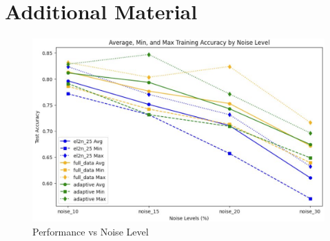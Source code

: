\documentclass{article}
\begin{document}
\appendix
\section{Additional Material}

\begin{figure}
    \includegraphics[scale=0.3]{graph-perf-noise.png}
    \caption{Performance vs Noise Level}
    \label{fig:perf-noise}
\end{figure}
\end{document}
